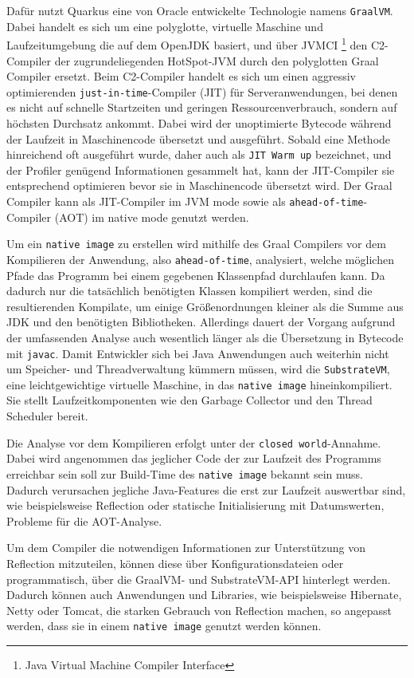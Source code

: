 Dafür nutzt Quarkus eine von Oracle entwickelte Technologie namens \verb|GraalVM|.
Dabei handelt es sich um eine polyglotte, virtuelle Maschine und Laufzeitumgebung die auf dem OpenJDK basiert, und über
JVMCI \footnote{Java Virtual Machine Compiler Interface} den C2-Compiler der zugrundeliegenden HotSpot-JVM durch den
polyglotten Graal Compiler ersetzt.\parencite{GraalVM}
Beim C2-Compiler handelt es sich um einen aggressiv optimierenden \verb|just-in-time|-Compiler (JIT) für Serveranwendungen, bei denen es nicht auf
schnelle Startzeiten und geringen Ressourcenverbrauch, sondern auf höchsten Durchsatz ankommt.
Dabei wird der unoptimierte Bytecode während der Laufzeit in Maschinencode übersetzt und ausgeführt. Sobald eine Methode hinreichend oft
ausgeführt wurde, daher auch als \verb|JIT Warm up| bezeichnet, und der Profiler genügend Informationen gesammelt hat, kann der JIT-Compiler
sie entsprechend optimieren bevor sie in Maschinencode übersetzt wird.
Der Graal Compiler kann als JIT-Compiler im JVM mode sowie als \verb|ahead-of-time|-Compiler (AOT) im native mode genutzt werden.\newline

Um ein \verb|native image| zu erstellen wird mithilfe des Graal Compilers vor dem Kompilieren der Anwendung, also \verb|ahead-of-time|,
analysiert, welche möglichen Pfade das Programm bei einem gegebenen Klassenpfad durchlaufen kann. Da dadurch nur die tatsächlich benötigten Klassen
kompiliert werden, sind die resultierenden Kompilate, um einige Größenordnungen kleiner als die Summe aus JDK und den benötigten Bibliotheken.
Allerdings dauert der Vorgang aufgrund der umfassenden Analyse auch wesentlich länger als die Übersetzung in Bytecode mit \verb|javac|.
Damit Entwickler sich bei Java Anwendungen auch weiterhin nicht um Speicher- und Threadverwaltung kümmern müssen, wird die \verb|SubstrateVM|, eine
leichtgewichtige virtuelle Maschine, in das \verb|native image| hineinkompiliert.
Sie stellt Laufzeitkomponenten wie den Garbage Collector und den Thread Scheduler bereit.

Die Analyse vor dem Kompilieren erfolgt unter der \verb|closed world|-Annahme. Dabei wird angenommen das jeglicher Code der zur Laufzeit des Programms
erreichbar sein soll zur Build-Time des \verb|native image| bekannt sein muss. Dadurch verursachen jegliche Java-Features die erst zur Laufzeit
auswertbar sind, wie beispielsweise Reflection oder statische Initialisierung mit Datumswerten, Probleme für die AOT-Analyse.

Um dem Compiler die notwendigen Informationen zur Unterstützung von Reflection mitzuteilen, können
diese über Konfigurationsdateien oder programmatisch, über die GraalVM- und SubstrateVM-API hinterlegt werden.
Dadurch können auch Anwendungen und Libraries, wie beispielsweise Hibernate, Netty oder Tomcat,
die starken Gebrauch von Reflection machen, so angepasst werden, dass sie in einem \verb|native image| genutzt werden können.
\parencite{GraalVMNativeImage}

